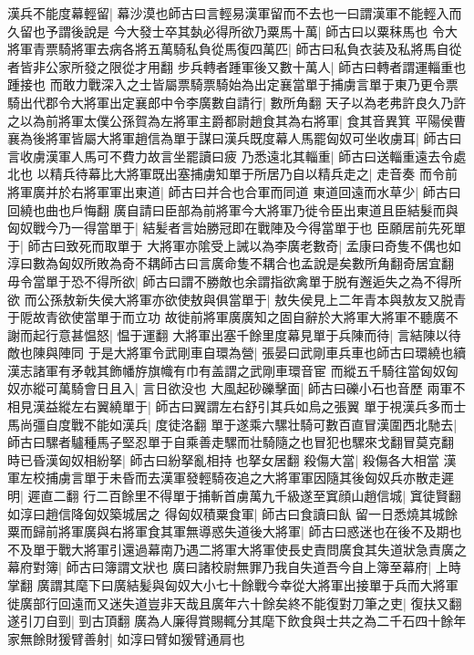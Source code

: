 漢兵不能度幕輕留|{
	幕沙漠也師古曰言輕易漢軍留而不去也一曰謂漢軍不能輕入而久留也予謂後說是}
今大發士卒其埶必得所欲乃粟馬十萬|{
	師古曰以粟秣馬也}
令大將軍青票騎將軍去病各將五萬騎私負從馬復四萬匹|{
	師古曰私負衣装及私將馬自從者皆非公家所發之限從才用翻}
步兵轉者踵軍後又數十萬人|{
	師古曰轉者謂運輜重也踵接也}
而敢力戰深入之士皆屬票騎票騎始為出定襄當單于捕虜言單于東乃更令票騎出代郡令大將軍出定襄郎中令李廣數自請行|{
	數所角翻}
天子以為老弗許良久乃許之以為前將軍太僕公孫賀為左將軍主爵都尉趙食其為右將軍|{
	食其音異箕}
平陽侯曹襄為後將軍皆屬大將軍趙信為單于謀曰漢兵既度幕人馬罷匈奴可坐收虜耳|{
	師古曰言收虜漢軍人馬可不費力故言坐罷讀曰疲}
乃悉遠北其輜重|{
	師古曰送輜重遠去令處北也}
以精兵待幕比大將軍既出塞捕虜知單于所居乃自以精兵走之|{
	走音奏}
而令前將軍廣并於右將軍軍出東道|{
	師古曰并合也合軍而同道}
東道回遠而水草少|{
	師古曰回繞也曲也戶悔翻}
廣自請曰臣部為前將軍今大將軍乃徙令臣出東道且臣結髮而與匈奴戰今乃一得當單于|{
	結髪者言始勝冠即在戰陣及今得當單于也}
臣願居前先死單于|{
	師古曰致死而取單于}
大將軍亦隂受上誡以為李廣老數奇|{
	孟康曰奇隻不偶也如淳曰數為匈奴所敗為奇不耦師古曰言廣命隻不耦合也孟說是矣數所角翻奇居宜翻}
毋令當單于恐不得所欲|{
	師古曰謂不勝敵也余謂指欲禽單于脱有邂逅失之為不得所欲}
而公孫敖新失侯大將軍亦欲使敖與俱當單于|{
	敖失侯見上二年青本與敖友又脱青于阸故青欲使當單于而立功}
故徙前將軍廣廣知之固自辭於大將軍大將軍不聽廣不謝而起行意甚愠怒|{
	愠于運翻}
大將軍出塞千餘里度幕見單于兵陳而待|{
	言結陳以待敵也陳與陣同}
于是大將軍令武剛車自環為營|{
	張晏曰武剛車兵車也師古曰環繞也續漢志諸軍有矛戟其飾幡斿旗幟有巾有盖謂之武剛車環音宦}
而縱五千騎往當匈奴匈奴亦縱可萬騎會日且入|{
	言日欲没也}
大風起砂礫擊面|{
	師古曰礫小石也音歷}
兩軍不相見漢益縱左右翼繞單于|{
	師古曰翼謂左右舒引其兵如烏之張翼}
單于視漢兵多而士馬尚彊自度戰不能如漢兵|{
	度徒洛翻}
單于遂乘六騾壮騎可數百直冒漢圍西北馳去|{
	師古曰騾者驢種馬子堅忍單于自乘善走騾而壮騎隨之也冒犯也騾來戈翻冒莫克翻}
時已昏漢匈奴相紛拏|{
	師古曰紛拏亂相持也拏女居翻}
殺傷大當|{
	殺傷各大相當}
漢軍左校捕虜言單于未昏而去漢軍發輕騎夜追之大將軍軍因隨其後匈奴兵亦散走遲明|{
	遲直二翻}
行二百餘里不得單于捕斬首虜萬九千級遂至窴顔山趙信城|{
	窴徒賢翻如淳曰趙信降匈奴築城居之}
得匈奴積粟食軍|{
	師古曰食讀曰飤}
留一日悉燒其城餘粟而歸前將軍廣與右將軍食其軍無導惑失道後大將軍|{
	師古曰惑迷也在後不及期也}
不及單于戰大將軍引還過幕南乃遇二將軍大將軍使長史責問廣食其失道狀急責廣之幕府對簿|{
	師古曰簿謂文狀也}
廣曰諸校尉無罪乃我自失道吾今自上簿至幕府|{
	上時掌翻}
廣謂其麾下曰廣結髪與匈奴大小七十餘戰今幸從大將軍出接單于兵而大將軍徙廣部行回遠而又迷失道豈非天哉且廣年六十餘矣終不能復對刀筆之吏|{
	復扶又翻}
遂引刀自剄|{
	剄古頂翻}
廣為人廉得賞賜輒分其麾下飲食與士共之為二千石四十餘年家無餘財猨臂善射|{
	如淳曰臂如猨臂通肩也}
